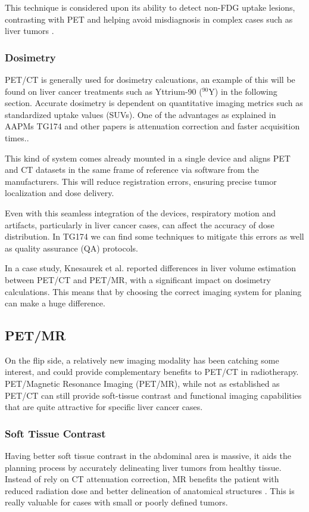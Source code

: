 \documentclass[11pt]{article} %
\begin{document}
\begin{multicols}{2}
This technique is considered upon its ability to detect non-FDG uptake lesions, contrasting with PET and helping avoid misdiagnosis in complex cases such as liver tumors \cite{yan2024, decazes2021}.


\subsubsection{Dosimetry}
PET/CT is generally used for dosimetry calcuations, an example of this will be found on liver cancer treatments such as Yttrium-90 (\(^{90}\text{Y}\)) in the following section. Accurate dosimetry is dependent on quantitative imaging metrics such as standardized uptake values (SUVs). One of the advantages as explained in AAPMs TG174 and other papers is attenuation correction and faster acquisition times.\cite{knesaurek2018,TG174}. 

This kind of system comes already mounted in a single device and aligns PET and CT datasets in the same frame of reference via software from the manufacturers.\cite{TG174} This will reduce registration errors, ensuring precise tumor localization and dose delivery. 

Even with this seamless integration of the devices, respiratory motion and artifacts, particularly in liver cancer cases, can affect the accuracy of dose distribution. In TG174 we can find some techniques to mitigate this errors as well as quality assurance (QA) protocols.

In a case study, Knesaurek et al. \cite{knesaurek2018} reported differences in liver volume estimation between PET/CT and PET/MR, with a significant impact on dosimetry calculations. This means that by choosing the correct imaging system for planing can make a huge difference. 

\subsection{PET/MR}
On the flip side, a relatively new imaging modality has been catching some interest, and could provide complementary benefits to PET/CT in radiotherapy. PET/Magnetic Resonance Imaging (PET/MR), while not as established as PET/CT can still provide soft-tissue contrast and functional imaging capabilities that are quite attractive for specific liver cancer cases. 

\subsubsection{Soft Tissue Contrast}
Having better soft tissue contrast in the abdominal area is massive, it aids the planning process by accurately delineating liver tumors from healthy tissue. Instead of rely on CT attenuation correction, MR benefits the patient with reduced radiation dose and better delineation of anatomical structures \cite{knesaurek2018}. This is really valuable for cases with small or poorly defined tumors.


\end{multicols}
\end{document}

